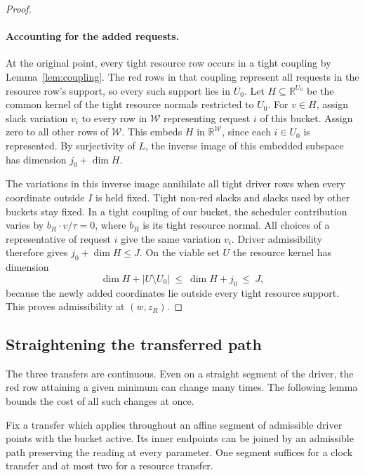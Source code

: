 \begin{proof}
\paragraph{Accounting for the added requests.}
At the original point, every tight resource row occurs in a tight
coupling by Lemma~\ref{lem:coupling}. The red rows in that coupling
represent all requests in the resource row's support, so every such
support lies in \(U_0\). Let \(H\subseteq\mathbb R^{U_0}\) be the
common kernel of the tight resource normals restricted to \(U_0\).
For \(v\in H\), assign slack variation \(v_i\) to every row in
\(\mathcal W\) representing request \(i\) of this bucket. Assign zero
to all other rows of \(\mathcal W\). This embeds \(H\) in
\(\mathbb R^{\mathcal W}\), since each \(i\in U_0\) is represented.
By surjectivity of \(L\), the inverse image of this embedded subspace
has dimension \(j_0+\dim H\).

The variations in this inverse image annihilate all tight driver rows
when every coordinate outside \(I\) is held fixed. Tight non-red
slacks and slacks used by other buckets stay fixed. In a tight
coupling of our bucket, the scheduler contribution varies by
\(b_R\cdot v/\tau=0\), where \(b_R\) is its tight resource normal.
All choices of a representative of request \(i\) give the same
variation \(v_i\). Driver admissibility therefore gives
\(j_0+\dim H\le J\). On the viable set \(U\) the resource kernel
has dimension
\[
         \dim H+|U\setminus U_0|\ \le\ \dim H+j_0\ \le\ J,
\]
because the newly added coordinates lie outside every tight resource
support. This proves admissibility at \((w,z_R)\).
\end{proof}

\subsection{Straightening the transferred path}

The three transfers are continuous. Even on a straight segment of the
driver, the red row attaining a given minimum can change many times.
The following lemma bounds the cost of all such changes at once.

\begin{lemma}\label{lem:two-chords}
Fix a transfer which applies throughout an affine segment of
admissible driver points with the bucket active. Its inner endpoints
can be joined by an admissible path preserving the reading at every
parameter. One segment suffices for a clock transfer and at most
two for a resource transfer.
\end{lemma}

